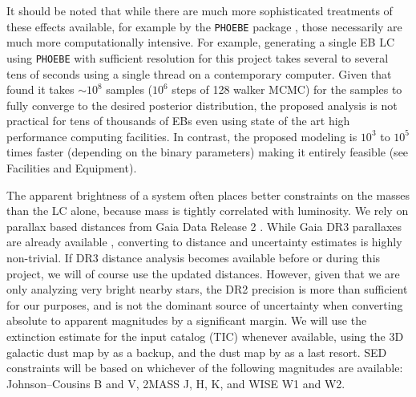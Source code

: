 It should be noted that while there are much more sophisticated treatments of
these effects available, for example by the \texttt{PHOEBE} package
\citep{Prsa_Zwitter_05, Prsa_et_al_16, Horvat_et_al_18, Jones_et_al_20,
Conroy_et_al_20}, those necessarily are much more computationally intensive. For
example, generating a single EB LC using \texttt{PHOEBE} with sufficient
resolution for this project takes several to several tens of seconds using a
single thread on a contemporary computer. Given that \citep{Windemuth_et_al_19}
found it takes $\sim10^8$ samples ($10^6$ steps of 128 walker MCMC) for the
samples to fully converge to the desired posterior distribution, the proposed
analysis is not practical for tens of thousands of EBs even using state of the
art high performance computing facilities. In contrast, the proposed modeling is
$10^3$ to $10^5$ times faster (depending on the binary parameters) making it
entirely feasible (see Facilities and Equipment).

The apparent brightness of a system often places better constraints on the
masses than the LC alone, because mass is tightly correlated with luminosity. We
rely on parallax based distances from Gaia Data Release 2
\citep{Bailer-Jones_et_al_18}. While Gaia DR3 parallaxes are already available
\citep{GaiaDR3_22}, converting to distance and uncertainty estimates is highly
non-trivial. If DR3 distance analysis becomes available before or during this
project, we will of course use the updated distances. However, given that we are
only analyzing very bright nearby stars, the DR2 precision is more than
sufficient for our purposes, and is not the dominant source of uncertainty when
converting absolute to apparent magnitudes by a significant margin. We will use
the extinction estimate for the \tess{} input catalog (TIC) whenever available,
using the 3D galactic dust map by \citep{Green_et_al_19} as a backup, and the
dust map by \citep{Schlegel_et_al_98} as a last resort. SED constraints will be
based on whichever of the following magnitudes are available: Johnson–Cousins B
and V, 2MASS J, H, K, and WISE W1 and W2.

